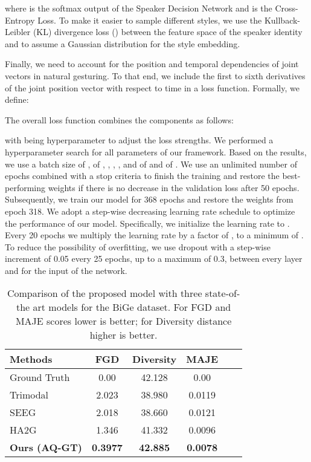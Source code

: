 \documentclass[sigconf]{acmart}
\begin{document}
where  is the softmax output of the Speaker Decision Network and  is the Cross-Entropy Loss. To make it easier to sample different styles, we use the Kullback-Leibler (KL) divergence loss () between the feature space of the speaker identity and  to assume a Gaussian distribution for the style embedding.

Finally, we need to account for the position and temporal dependencies of joint vectors in natural gesturing. To that end, we include the first to sixth derivatives of the joint position vector with respect to time in a loss function. Formally, we define:


The overall loss function combines the components as follows:

with  being hyperparameter to adjust the loss strengths. We performed a hyperparameter search for all parameters of our framework. Based on the results, we use a batch size of ,  of , , , , and  of  and  of . We use an unlimited number of epochs combined with a stop criteria to finish the training and restore the best-performing weights if there is no decrease in the validation loss after 50 epochs. Subsequently, we train our model for 368 epochs and restore the weights from epoch 318. 
We adopt a step-wise decreasing learning rate schedule to optimize the performance of our model. Specifically, we initialize the learning rate to . Every 20 epochs we multiply the learning rate by a factor of , to a minimum of . To reduce the possibility of overfitting, we use dropout with a step-wise increment of 0.05 every 25 epochs, up to a maximum of 0.3, between every layer and for the input of the network.

\begin{table}[bt]
    \caption{Comparison of the proposed model with three state-of-the art models for the BiGe dataset. For FGD and MAJE scores lower is better; for Diversity distance higher is better.}
  \centering
  \begin{tabular}{lccccc}
    \toprule
    Methods & FGD  & Diversity  & MAJE \\
    \midrule
    Ground Truth & 0.00 & 42.128 & 0.00\\
    \midrule
     Trimodal \cite{yoonSpeechGestureGeneration2020} & 2.023 & 38.980 & 0.0119\\
     SEEG \cite{liangSEEGSemanticEnergized2022} & 2.018  & 38.660 & 0.0121\\
     HA2G \cite{liuLearningHierarchicalCrossModal2022a}   & 1.346  & 41.332 & 0.0096\\
     \midrule 
     \textbf{Ours (AQ-GT)} & \textbf{0.3977} & \textbf{42.885} & \textbf{0.0078}\\
    \bottomrule
  \end{tabular}
  \label{tbl:res}
\end{table}
\end{document}
